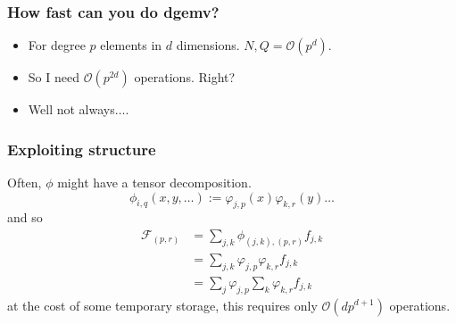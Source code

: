 \documentclass[presentation]{beamer}
\begin{document}
\begin{frame}
  \frametitle{How fast can you do dgemv?}
  \begin{itemize}
  \item For degree $p$ elements in $d$ dimensions. $N, Q = \mathcal{O}(p^d)$.
  \item<2-> So I need $\mathcal{O}(p^{2d})$ operations.  Right?
  \item<3-> Well not always$\dots$.
  \end{itemize}
\end{frame}

\begin{frame}
  \frametitle{Exploiting structure}
  Often, $\phi$ might have a tensor decomposition.
  \begin{equation*}
    \phi_{i,q}(x,y,\dots) :=  \varphi_{j,p}(x)\varphi_{k,r}(y)\dots
  \end{equation*}
  and so
  \begin{align*}
    \mathcal{F}_{(p,r)} &= \sum_{j,k} \phi_{(j,k),(p,r)} f_{j,k} \\
                        &= \sum_{j,k} \varphi_{j,p}\varphi_{k,r} f_{j,k} \\
                        &= \sum_j \varphi_{j,p} \sum_k \varphi_{k,r} f_{j,k}
  \end{align*}
  at the cost of some temporary storage, this requires only
  $\mathcal{O}(d p^{d+1})$ operations.
\end{frame}
\end{document}
